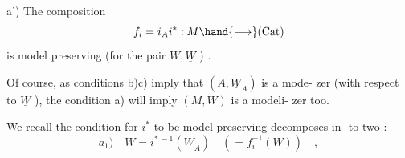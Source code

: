 a') The composition
\[ f_i = i_A i^* : M \hand{\longrightarrow} (\mathrm{Cat}) \]
is model preserving (for the pair $W,\underline{W}$ ) .

Of course, as conditions b)\hand{,}c) imply that  $(A\hat{}, \underline{W}_A)$ is a mode-%
zer (with respect to $\underline{W}$ ), the condition a) will imply $(M,W)$ is a modeli-%
zer too.

We recall the condition for $i^*$ to be model preserving decomposes in-%
to two :
\[ a_1) \quad W = i^{*\,-1}(\underline{W}_A) \quad ( = f_i^{-1}(\underline{W})) \quad , \]

